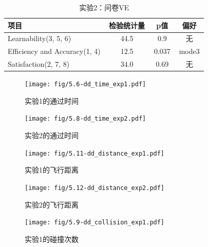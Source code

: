 \begin{table}[t]
    \vspace{0.5cm}

    \begin{minipage}{\textwidth}
        \centering
        \caption{实验2：问卷VE}
        \begin{tabular}{@{}p{0.5\linewidth}ccc@{}}
            \toprule
            \textbf{项目}                 & \textbf{检验统计量} & \textbf{p值} & \textbf{偏好} \\ \midrule
            Learnability(3, 5, 6)         & 44.5            & 0.9          & 无           \\
            Efficiency and Accuracy(1, 4) & 12.5            & 0.037        & mode3       \\
            Satisfaction(2, 7, 8)         & 34.0            & 0.69         & 无           \\ \bottomrule
        \end{tabular}
    \end{minipage}
\end{table}

\clearpage
\begin{figure}[htb]
    \texttt{[image: fig/5.6-dd\_time\_exp1.pdf]}
    \centering
    \caption{实验1的通过时间}
    \label{fig:5.6-dd_time_exp1}
\end{figure}

\begin{figure}[htb]
    \texttt{[image: fig/5.8-dd\_time\_exp2.pdf]}
    \centering
    \caption{实验2的通过时间}
    \label{fig:5.8-dd_time_exp2}
\end{figure}

\begin{figure}[htb]
    \texttt{[image: fig/5.11-dd\_distance\_exp1.pdf]}
    \centering
    \caption{实验1的飞行距离}
    \label{fig:5.11-dd_distance_exp1}
\end{figure}

\begin{figure}[htb]
    \texttt{[image: fig/5.12-dd\_distance\_exp2.pdf]}
    \centering
    \caption{实验2的飞行距离}
    \label{fig:5.12-dd_distance_exp2}
\end{figure}


\begin{figure}[htb]
    \texttt{[image: fig/5.9-dd\_collision\_exp1.pdf]}
    \centering
    \caption{实验1的碰撞次数}
    \label{fig:5.9-dd_collision_exp1}
\end{figure}

